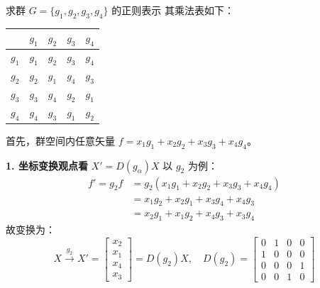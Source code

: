 \begin{example}{求群 $G=\{g_1, g_2, g_3, g_4\}$ 的正则表示}
    其乘法表如下：
    \begin{center}
    \begin{tabular}{c|cccc}
        & $g_1$ & $g_2$ & $g_3$ & $g_4$ \\
        \hline
        $g_1$ & $g_1$ & $g_2$ & $g_3$ & $g_4$ \\
        $g_2$ & $g_2$ & $g_1$ & $g_4$ & $g_3$ \\
        $g_3$ & $g_3$ & $g_4$ & $g_2$ & $g_1$ \\
        $g_4$ & $g_4$ & $g_3$ & $g_1$ & $g_2$ \\
    \end{tabular}
    \end{center}
    
    首先，群空间内任意矢量 $f = x_1 g_1 + x_2 g_2 + x_3 g_3 + x_4 g_4$。

    \textbf{1. 坐标变换观点看} $X' = D(g_\alpha)X$
    以 $g_2$ 为例：
    \begin{equation}
        \begin{aligned}
            f' = g_2 f &= g_2 (x_1 g_1 + x_2 g_2 + x_3 g_3 + x_4 g_4) \\
            &= x_1 g_2 + x_2 g_1 + x_3 g_4 + x_4 g_3 \\
            &= x_2 g_1 + x_1 g_2 + x_4 g_3 + x_3 g_4
        \end{aligned}
    \end{equation}
    故变换为：
    \begin{equation}
        X \xrightarrow{g_2} X' = \begin{bmatrix} x_2 \\ x_1 \\ x_4 \\ x_3 \end{bmatrix} = D(g_2)X, \quad D(g_2) = \begin{bmatrix} 0 & 1 & 0 & 0 \\ 1 & 0 & 0 & 0 \\ 0 & 0 & 0 & 1 \\ 0 & 0 & 1 & 0 \end{bmatrix}
    \end{equation}


\end{example}
